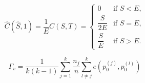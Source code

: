 \documentclass[20pt,a4paper]{extarticle}
\begin{document}
\begin{equation}
	\hat{C}\left(\hat{S},1\right) = \dfrac{1}{E}C\left(S,T\right) = 
    \begin{cases}
        0 & \text{if }S < E, \\
        \dfrac{S}{2E} & \text{if }S = E, \\
        \dfrac{S}{E} & \text{if }S > E.
    \end{cases}
\end{equation}

\bigskip 

\begin{equation}
	\Gamma_v = \dfrac{1}{k\left(k-1\right)}\sum^k_{j=1}{
        \dfrac{n_j}{n}
        \sum^k_{l\neq j}
        {e\left(
            p^{\left(j\right)}_0,
            p^{\left(l\right)}_0
        \right)}}
\end{equation}
\end{document}
